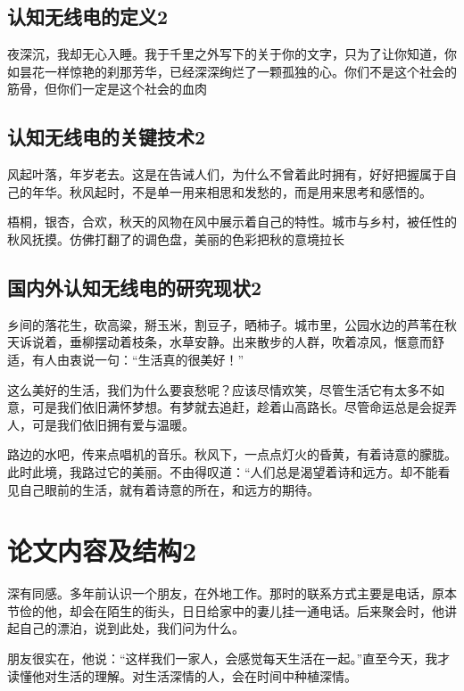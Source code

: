 \subsection{认知无线电的定义2}
夜深沉，我却无心入睡。我于千里之外写下的关于你的文字，只为了让你知道，你如昙花一样惊艳的刹那芳华，已经深深绚烂了一颗孤独的心。你们不是这个社会的筋骨，但你们一定是这个社会的血肉
\subsection{认知无线电的关键技术2}
风起叶落，年岁老去。这是在告诫人们，为什么不曾着此时拥有，好好把握属于自己的年华。秋风起时，不是单一用来相思和发愁的，而是用来思考和感悟的。



梧桐，银杏，合欢，秋天的风物在风中展示着自己的特性。城市与乡村，被任性的秋风抚摸。仿佛打翻了的调色盘，美丽的色彩把秋的意境拉长
\subsection{国内外认知无线电的研究现状2}
乡间的落花生，砍高粱，掰玉米，割豆子，晒柿子。城市里，公园水边的芦苇在秋天诉说着，垂柳摆动着枝条，水草安静。出来散步的人群，吹着凉风，惬意而舒适，有人由衷说一句：“生活真的很美好！”



这么美好的生活，我们为什么要哀愁呢？应该尽情欢笑，尽管生活它有太多不如意，可是我们依旧满怀梦想。有梦就去追赶，趁着山高路长。尽管命运总是会捉弄人，可是我们依旧拥有爱与温暖。



路边的水吧，传来点唱机的音乐。秋风下，一点点灯火的昏黄，有着诗意的朦胧。此时此境，我路过它的美丽。不由得叹道：“人们总是渴望着诗和远方。却不能看见自己眼前的生活，就有着诗意的所在，和远方的期待。
\section{论文内容及结构2}
深有同感。多年前认识一个朋友，在外地工作。那时的联系方式主要是电话，原本节俭的他，却会在陌生的街头，日日给家中的妻儿挂一通电话。后来聚会时，他讲起自己的漂泊，说到此处，我们问为什么。



朋友很实在，他说：“这样我们一家人，会感觉每天生活在一起。”直至今天，我才读懂他对生活的理解。对生活深情的人，会在时间中种植深情。




